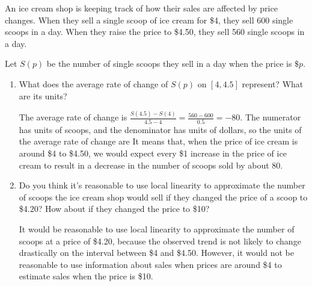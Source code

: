 \documentclass{article}
\begin{document}
\begin{enumerate}
  An ice cream shop is keeping track of how their sales are affected by price changes. When they sell a single scoop of ice cream for \$4, they sell 600 single scoops in a day. When they raise the price to \$4.50, they sell 560 single scoops in a day.

  Let $S(p)$ be the number of single scoops they sell in a day when the price is $\$p$.

  \begin{enumerate}
  \item
    \begin{problem}[1in]
      What does the average rate of change of $S(p)$ on $[4, 4.5]$ represent? What are its units?
    \end{problem}

    \begin{solution}
      The average rate of change is $\frac{S(4.5)-S(4)}{4.5-4}=\frac{560-600}{0.5}=-80$. 
      The numerator has units of scoops, and the denominator has units of dollars, 
      so the units of the average rate of change are  It means that,
      when the price of ice cream is around \$4 to \$4.50, we would expect every \$1 increase in the price of ice cream
      to result in a decrease in the number of scoops sold by about 80.
    \end{solution}

  \item
    \begin{problem}
      Do you think it's reasonable to use local linearity to approximate the number of scoops the ice cream shop would sell if they changed the price of a scoop to \$4.20? How about if they changed the price to \$10?
    \end{problem}

    \begin{solution}
      It would be reasonable to use local linearity to approximate the number of scoops at a price of \$4.20,
      because the observed trend is not likely to change drastically on the interval between \$4 and \$4.50.
      However, it would not be reasonable to use information about sales when prices are around \$4 to estimate
      sales when the price is \$10. 
    \end{solution}

  \end{enumerate}

\end{enumerate}
\end{document}
